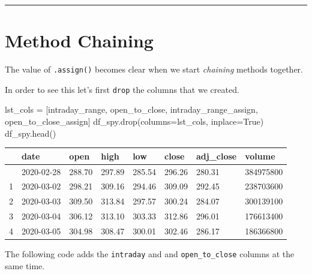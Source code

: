 \documentclass[
  letterpaper,
  DIV=11,
  numbers=noendperiod]{scrreprt}
\newenvironment{Shaded}{\begin{snugshade}}{\end{snugshade}}
\newcommand{\NormalTok}[1]{\textcolor[rgb]{0.00,0.23,0.31}{#1}}
\newcommand{\OperatorTok}[1]{\textcolor[rgb]{0.37,0.37,0.37}{#1}}
\newcommand{\StringTok}[1]{\textcolor[rgb]{0.13,0.47,0.30}{#1}}
\newcommand{\VariableTok}[1]{\textcolor[rgb]{0.07,0.07,0.07}{#1}}
\begin{document}
\begin{center}\rule{0.5\linewidth}{0.5pt}\end{center}

\hypertarget{method-chaining}{%
\section{Method Chaining}\label{method-chaining}}

The value of \texttt{.assign()} becomes clear when we start
\emph{chaining} methods together.

In order to see this let's first \texttt{drop} the columns that we
created.

\begin{Shaded}
\begin{Highlighting}[]
\NormalTok{lst\_cols }\OperatorTok{=}\NormalTok{ [}\StringTok{\textquotesingle{}intraday\_range\textquotesingle{}}\NormalTok{, }\StringTok{\textquotesingle{}open\_to\_close\textquotesingle{}}\NormalTok{, }\StringTok{\textquotesingle{}intraday\_range\_assign\textquotesingle{}}\NormalTok{, }\StringTok{\textquotesingle{}open\_to\_close\_assign\textquotesingle{}}\NormalTok{]}
\NormalTok{df\_spy.drop(columns}\OperatorTok{=}\NormalTok{lst\_cols, inplace}\OperatorTok{=}\VariableTok{True}\NormalTok{)}
\NormalTok{df\_spy.head()}
\end{Highlighting}
\end{Shaded}

\begin{longtable}[]{@{}llllllll@{}}
\toprule\noalign{}
& date & open & high & low & close & adj\_close & volume \\
\midrule\noalign{}
\endhead
\bottomrule\noalign{}
\endlastfoot
0 & 2020-02-28 & 288.70 & 297.89 & 285.54 & 296.26 & 280.31 &
384975800 \\
1 & 2020-03-02 & 298.21 & 309.16 & 294.46 & 309.09 & 292.45 &
238703600 \\
2 & 2020-03-03 & 309.50 & 313.84 & 297.57 & 300.24 & 284.07 &
300139100 \\
3 & 2020-03-04 & 306.12 & 313.10 & 303.33 & 312.86 & 296.01 &
176613400 \\
4 & 2020-03-05 & 304.98 & 308.47 & 300.01 & 302.46 & 286.17 &
186366800 \\
\end{longtable}

The following code adds the \texttt{intraday} and and
\texttt{open\_to\_close} columns at the same time.
\end{document}
